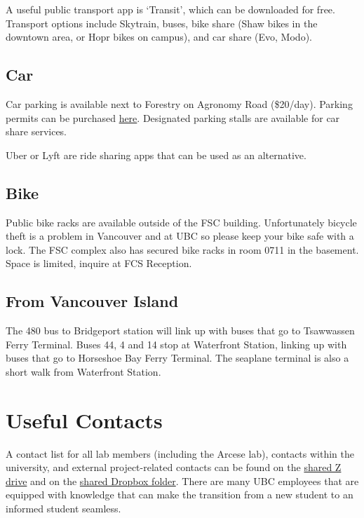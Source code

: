\documentclass[
]{book}
\begin{document}
A useful public transport app is `Transit', which can be downloaded for free. Transport options include Skytrain, buses, bike share (Shaw bikes in the downtown area, or Hopr bikes on campus), and car share (Evo, Modo).

\hypertarget{car}{%
\section{Car}\label{car}}

Car parking is available next to Forestry on Agronomy Road (\$20/day). Parking permits can be purchased \href{https://parking.ubc.ca/permits-rates}{here}. Designated parking stalls are available for car share services.

Uber or Lyft are ride sharing apps that can be used as an alternative.

\hypertarget{bike}{%
\section{Bike}\label{bike}}

Public bike racks are available outside of the FSC building. Unfortunately bicycle theft is a problem in Vancouver and at UBC so please keep your bike safe with a lock. The FSC complex also has secured bike racks in room 0711 in the basement. Space is limited, inquire at FCS Reception.

\hypertarget{from-vancouver-island}{%
\section{From Vancouver Island}\label{from-vancouver-island}}

The 480 bus to Bridgeport station will link up with buses that go to Tsawwassen Ferry Terminal. Buses 44, 4 and 14 stop at Waterfront Station, linking up with buses that go to Horseshoe Bay Ferry Terminal. The seaplane terminal is also a short walk from Waterfront Station.

\hypertarget{contacts}{%
\chapter*{Useful Contacts}\label{contacts}}

A contact list for all lab members (including the Arcese lab), contacts within the university, and external project-related contacts can be found on the \protect\hyperlink{sharednetworkdrive}{shared Z drive} and on the \protect\hyperlink{dropbox}{shared Dropbox folder}. There are many UBC employees that are equipped with knowledge that can make the transition from a new student to an informed student seamless.
\end{document}
